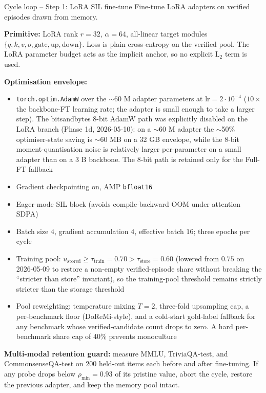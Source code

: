 \documentclass[10pt,aspectratio=169]{beamer}
\begin{document}
\begin{frame}{Cycle loop -- Step 1: LoRA SIL fine-tune}
  \scriptsize
  Fine-tune LoRA adapters on verified episodes drawn from memory.

  \vspace{0.3em}
  \textbf{Primitive:} LoRA rank $r{=}32$, $\alpha{=}64$, all-linear target modules $\{q, k, v, o, \text{gate}, \text{up}, \text{down}\}$. Loss is plain cross-entropy on the verified pool. The LoRA parameter budget acts as the implicit anchor, so no explicit L$_2$ term is used.

  \vspace{0.3em}
  \textbf{Optimisation envelope:}
  \begin{itemize}\scriptsize
    \item \texttt{torch.optim.AdamW} over the $\sim$60 M adapter parameters at $\text{lr}=2\!\cdot\!10^{-4}$ ($10\times$ the backbone-FT learning rate; the adapter is small enough to take a larger step). The bitsandbytes 8-bit AdamW path was explicitly disabled on the LoRA branch (Phase 1d, 2026-05-10): on a $\sim$60 M adapter the $\sim$50\% optimiser-state saving is $\sim$60 MB on a 32 GB envelope, while the 8-bit moment-quantisation noise is relatively larger per-parameter on a small adapter than on a 3 B backbone. The 8-bit path is retained only for the Full-FT fallback
    \item Gradient checkpointing on, AMP \texttt{bfloat16}
    \item Eager-mode SIL block (avoids compile-backward OOM under attention SDPA)
    \item Batch size $4$, gradient accumulation $4$, effective batch $16$; three epochs per cycle
    \item Training pool: $u_{\text{stored}} \ge \tau_{\text{train}} = 0.70 > \tau_{\text{store}} = 0.60$ (lowered from $0.75$ on 2026-05-09 to restore a non-empty verified-episode share without breaking the ``stricter than store'' invariant), so the training-pool threshold remains strictly stricter than the storage threshold
    \item Pool reweighting: temperature mixing $T{=}2$, three-fold upsampling cap, a per-benchmark floor (DoReMi-style), and a cold-start gold-label fallback for any benchmark whose verified-candidate count drops to zero. A hard per-benchmark share cap of $40\%$ prevents monoculture
  \end{itemize}

  \vspace{0.3em}
  \textbf{Multi-modal retention guard:} measure MMLU, TriviaQA-test, and CommonsenseQA-test on 200 held-out items each before and after fine-tuning. If \alert{any} probe drops below $\rho_{\min}=0.93$ of its pristine value, abort the cycle, restore the previous adapter, and keep the memory pool intact.


\end{frame}
\end{document}
